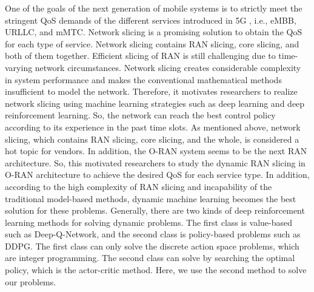 \documentclass{article}
\begin{document}
One of the goals of the next generation of mobile systems is to strictly meet the stringent QoS demands of the different services introduced in 5G , i.e., eMBB, URLLC, and mMTC. Network slicing is a promising solution to obtain the QoS for each type of service. Network slicing contains RAN slicing, core slicing, and both of them together. Efficient slicing of RAN is still challenging due to time-varying network circumstances.
Network slicing creates considerable complexity in system performance and makes the conventional mathematical methods insufficient to model the network.
Therefore, it motivates researchers to realize network slicing using machine learning strategies such as deep learning and deep reinforcement learning. So, the network can reach the best control policy according to its experience in the past time slots.
As mentioned above, network slicing, which contains RAN slicing, core slicing, and the whole, is considered a hot topic for vendors. In addition, the O-RAN system seems to be the next RAN architecture. So, this motivated researchers to study the dynamic RAN slicing in O-RAN architecture to achieve the desired QoS for each service type.
In addition, according to the high complexity of RAN slicing and incapability of the traditional model-based methods, dynamic machine learning becomes the best solution for these problems.
 Generally, there are two kinds of deep reinforcement learning methods for solving dynamic problems. The first class is value-based such as Deep-Q-Network, and the second class is policy-based problems such as DDPG. The first class can only solve the discrete action space problems, which are integer programming. The second class can solve by searching the optimal policy, which is the actor-critic method. Here, we use the second method to solve our problems.
 
\end{document}
